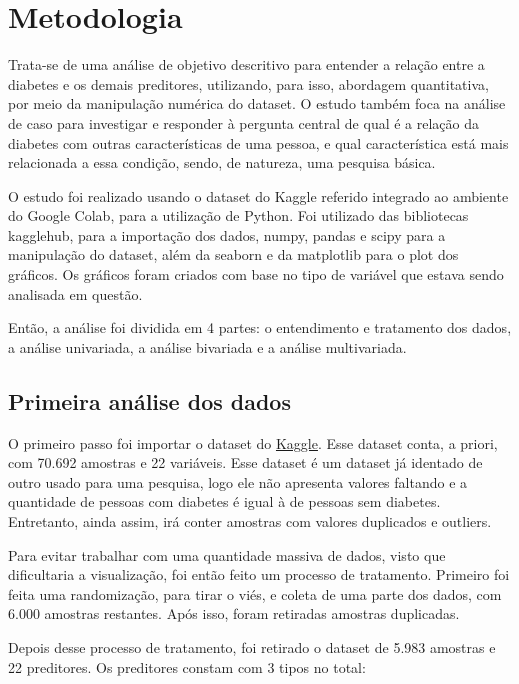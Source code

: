\documentclass[conference]{IEEEtran}
\begin{document}
\section{Metodologia}

Trata-se de uma análise de objetivo descritivo para entender a relação entre a diabetes e os demais preditores, utilizando, para isso, abordagem quantitativa, por meio da manipulação numérica do dataset. O estudo também foca na análise de caso para investigar e responder
à pergunta central de qual é a relação da diabetes com outras características de uma pessoa, e qual característica está mais relacionada a essa condição,
sendo, de natureza, uma pesquisa básica.


O estudo foi realizado usando o dataset do Kaggle referido integrado ao ambiente do Google Colab, para a utilização de Python.
Foi utilizado das bibliotecas kagglehub, para a importação dos dados, numpy, pandas e scipy para a manipulação do dataset, além da seaborn e da matplotlib 
para o plot dos gráficos. Os gráficos foram criados com base no tipo de variável que estava sendo analisada em questão.

Então, a análise foi dividida em 4 partes: o entendimento e tratamento dos dados, a análise univariada, a análise bivariada e a análise
multivariada.


\subsection{Primeira análise dos dados}

O primeiro passo foi importar o dataset do \href{https://www.kaggle.com/datasets/alexteboul/diabetes-health-indicators-dataset/data?select=diabetes_binary_5050split_health_indicators_BRFSS2015.csv}{Kaggle}. 
Esse dataset conta, a priori, com 70.692 amostras e 22 variáveis. Esse dataset é um dataset já identado de outro usado para uma pesquisa, logo 
ele não apresenta valores faltando e a quantidade de pessoas com diabetes é igual à de pessoas sem diabetes. Entretanto, ainda assim, 
irá conter amostras com valores duplicados e outliers.

Para evitar trabalhar com uma quantidade massiva de dados, visto que dificultaria a visualização, foi então feito um processo de tratamento.
Primeiro foi feita uma randomização, para tirar o viés, e coleta de uma parte dos dados, com 6.000 amostras restantes.
Após isso, foram retiradas amostras duplicadas.

Depois desse processo de tratamento, foi retirado o dataset de 5.983 amostras e 22 preditores. 
Os preditores constam com 3 tipos no total:
\end{document}
